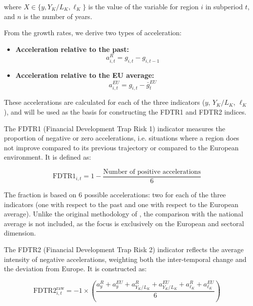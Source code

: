 \documentclass[a4paper,11pt,oneside]{article}
\begin{document}
\noindent where $X \in \{y, Y_K/L_K, \ell_K\}$ is the value of the variable 
for region $i$ in subperiod $t$, and $n$ is the number of years.

From the growth rates, we derive two types of acceleration:

\begin{itemize}
  \item \textbf{Acceleration relative to the past:}
  \begin{equation}
\label{eq:segunda}
  a^{R}_{i,t} = g_{i,t} - g_{i,t-1}
  \end{equation}

  \item \textbf{Acceleration relative to the EU average:}
  \begin{equation}
\label{eq:tercera}
  a^{EU}_{i,t} = g_{i,t} - \bar{g}^{EU}_{t}
  \end{equation}
\end{itemize}

These accelerations are calculated for each of the three indicators 
($y$, $Y_K/L_K$, $\ell_K$), and will be used as the basis for constructing 
the FDTR1 and FDTR2 indices.

The FDTR1 (Financial Development Trap Risk 1) indicator measures the 
proportion of negative or zero accelerations, i.e. situations where a 
region does not improve compared to its previous trajectory or compared 
to the European environment. It is defined as:

\begin{equation}
 \label{eq:cuarta}
\text{FDTR1}_{i,t} = 1 - \frac{\text{Number of positive accelerations}}{6}
\end{equation}

The fraction is based on 6 possible accelerations: two for each of the 
three indicators (one with respect to the past and one with respect to 
the European average). Unlike the original methodology of 
\cite{diemer2022regional}, the comparison with the national average is 
not included, as the focus is exclusively on the European and sectoral dimension.

The FDTR2 (Financial Development Trap Risk 2) indicator reflects the 
average intensity of negative accelerations, weighting both the 
inter-temporal change and the deviation from Europe. It is constructed as:

\begin{equation}
\label{eq:quinta}
\text{FDTR2}_{i,t}^{\text{raw}} = -1 \times \left( \frac{a^{R}_{y} + a^{EU}_{y} + 
a^{R}_{Y_K/L_K} + a^{EU}_{Y_K/L_K} + a^{R}_{\ell_K} + a^{EU}_{\ell_K}}{6} \right)
\end{equation}
\end{document}
